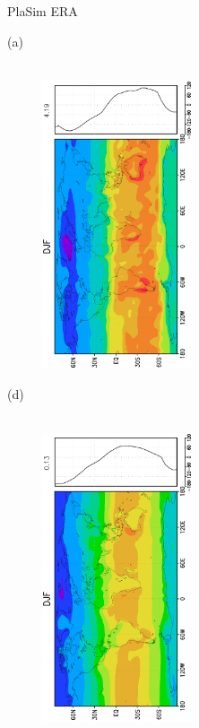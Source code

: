 \documentclass[12pt,a4paper,twoside,openright,headinclude,liststotoc,bibtotoc]{scrreprt}
\begin{document}
\begin{figure}[H]
\hspace{3.0cm}PlaSim \vspace{0.2cm}\hspace{7.2cm} ERA \\
\parbox{8.5cm}{\hspace{0.50cm}\begin{scriptsize}(a)\end{scriptsize} \vspace{-0.7cm} \\
\includegraphics[height=8.5cm,width=6.5cm,angle=-90]
{eps/zonalysmnetradDJF.eps}
}
\parbox{8.5cm}{\hspace{0.50cm}\begin{scriptsize}(d)\end{scriptsize} \vspace{-0.7cm} \\
\includegraphics[height=8.5cm,width=6.5cm,angle=-90]
{eps/zonalfinalt21ysmnetradDJF.eps}
}
\end{figure}
\end{document}
